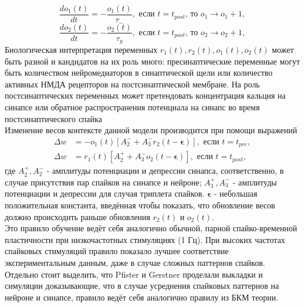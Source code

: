 \documentclass[a4paper,10pt]{article}
\begin{document}
\begin{equation*}
\frac{do_{1}(t)}{dt} = -\frac{o_{1}(t)}{\tau_{-}}, \mbox{ если } t=t_{post}\mbox{, то }o_{1} \rightarrow o_{1} + 1,
\end{equation*}
\begin{equation*}
\frac{do_{2}(t)}{dt} = -\frac{o_{2}(t)}{\tau_{y}}, \mbox{ если } t=t_{post}\mbox{, то }o_{2} \rightarrow o_{2} + 1,
\end{equation*}
\indent Биологическая интерпретация переменных $r_{1}(t),r_{2}(t), o_{1}(t), o_{2}(t)$ может быть разной и кандидатов на их роль много: пресинаптические переменные могут быть количеством нейромедиаторов в синаптической щели или количество активных НМДА рецепторов на постсинаптической мембране. На роль постсинаптических переменных может претендовать концентрация кальция на синапсе или обратное распространения потенциала на синапс во время постсинаптического спайка \\
\indent Изменение весов контексте данной модели производится при помощи выражений
\begin{equation*}
\begin{split}
\Delta w &= - o_{1}(t)[A_{2}^{-}+A_{3}^{-}r_{2}(t-\boldsymbol{\epsilon})], \mbox{ если } t=t_{pre},\\
\Delta w &= r_{1}(t)[A_{2}^{+}+A_{3}^{-}o_{2}(t-\boldsymbol{\epsilon})], \mbox{ если } t=t_{post},
\end{split}
\end{equation*}
где $A_{2}^{+},A_{2}^{-}$ - амплитуды потенциации и депрессии синапса, соответственно, в случае присутствия пар спайков на синапсе и нейроне; $A_{3}^{+},A_{3}^{-}$ - амплитуды потенциации и депрессии для случая триплета спайков. $\boldsymbol{\epsilon}$ - небольшая положительная константа, введённая чтобы показать, что обновление весов должно происходить раньше обновления $r_{2}(t)$ и  $o_{2}(t)$.\\
\indent Это правило обучение ведёт себя аналогично обычной, парной спайко-временной пластичности при низкочастотных стимуляциях (1 Гц). При высоких частотах спайковых стимуляций правило показало лучшее соответствие экспериментальным данным, даже в случае сложных паттернов спайков.\\
\indent Отдельно стоит выделить, что Pfister и Gerstner проделали выкладки и симуляции доказывающие, что в случае усреднения спайковых паттернов на нейроне и синапсе, правило ведёт себя аналогично правилу из БКМ теории.\\
\end{document}
